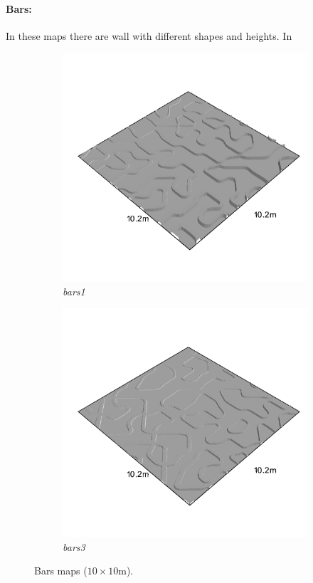\documentclass[../document.tex]{subfiles}
\begin{document}
\paragraph{Bars:} In these maps there are wall with different shapes and heights. In 
\begin{figure}[H]
    \centering
        \begin{subfigure}[b]{0.32\textwidth}
            \includegraphics[width=\textwidth]{../img/hm3d_borders/bars1.png}
            \caption{\emph{bars1}}
        \end{subfigure}
        \begin{subfigure}[b]{0.32 \linewidth}
            \includegraphics[width=\textwidth]{../img/hm3d_borders/bars3.png}
            \caption{\emph{bars3}}
            \end{subfigure}     
    \caption{Bars maps ($10\times10$m).}
\end{figure}
\end{document}
